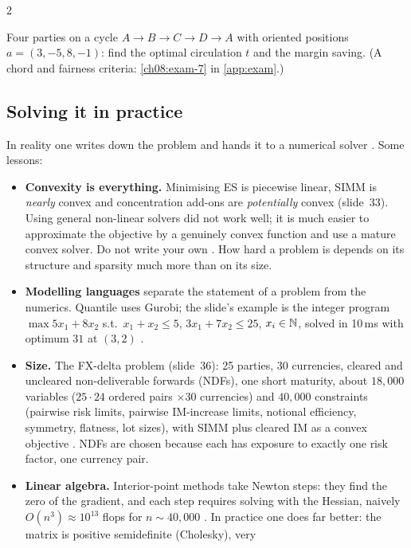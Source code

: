 \begin{paracol}{2}
\begin{exercise}\label{ch08:exam-7-short}
Four parties on a cycle $A\to B\to C\to D\to A$ with oriented positions $a=(3,-5,8,-1)$: find the optimal circulation $t$ and the margin saving. (A chord and fairness criteria: \cref{ch08:exam-7} in \cref{app:exam}.)
\end{exercise}

\subsection{Solving it in practice}
In reality one writes down the problem and hands it to a numerical solver . Some lessons:
\begin{itemize}
  \item \textbf{Convexity is everything.} Minimising ES is piecewise linear, SIMM is \emph{nearly} convex and
        concentration add-ons are \emph{potentially} convex (slide~33). Using general non-linear solvers did not
        work well; it is much easier to approximate the objective by a genuinely convex function and use a mature
        convex solver. Do not write your own . How hard a problem is depends on its structure
        and sparsity much more than on its size.
  \item \textbf{Modelling languages} separate the statement of a problem from the numerics. Quantile uses Gurobi;
        the slide's example is the integer program $\max 5x_1+8x_2$ s.t.\ $x_1+x_2\le5$, $3x_1+7x_2\le25$,
        $x_i\in\mathbb{N}$, solved in 10\,ms with optimum $31$ at $(3,2)$ .
  \item \textbf{Size.} The FX-delta problem (slide~36): 25 parties, 30 currencies, cleared and uncleared
        non-deliverable forwards (NDFs), one short maturity, about $18{,}000$ variables ($25\cdot24$ ordered pairs
        $\times30$ currencies) and $40{,}000$ constraints (pairwise risk limits, pairwise IM-increase limits, notional
        efficiency, symmetry, flatness, lot sizes), with SIMM plus cleared IM as a convex objective
        . NDFs are chosen because each has exposure to exactly one risk factor, one currency pair.
  \item \textbf{Linear algebra.} Interior-point methods take Newton steps: they find the zero of the gradient, and
        each step requires solving with the Hessian, naively $O(n^3)\approx10^{13}$ flops for $n\sim40{,}000$
        . In practice one does far better: the matrix is positive semidefinite (Cholesky), very

\end{itemize}
\end{paracol}
